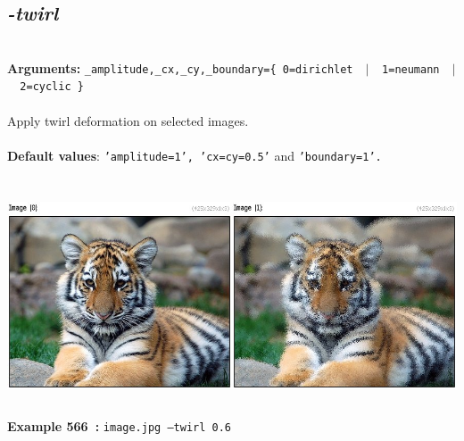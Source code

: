 \documentclass[a4paper,11pt,twoside]{book}
\begin{document}
\subsection{\emph{-twirl} }\vspace*{-0.5em}
~\\\textbf{Arguments: } 
{\small \texttt{\_amplitude,\_cx,\_cy,\_boundary=\{ 0=dirichlet ~$|$~ 1=neumann ~$|$~ 2=cyclic \}}}\\~\\
Apply twirl deformation on selected images.
~\\~\\\textbf{Default values}: {\small \texttt{'amplitude=1', 'cx=cy=0.5'} and \texttt{'boundary=1'.}}
\begin{center}\includegraphics[keepaspectratio=true,height=7cm,width=\textwidth]{img/gmic_def566.jpg}\\
{\footnotesize \textbf{Example 566~:} \texttt{image.jpg --twirl 0.6}}
\end{center}
\end{document}
